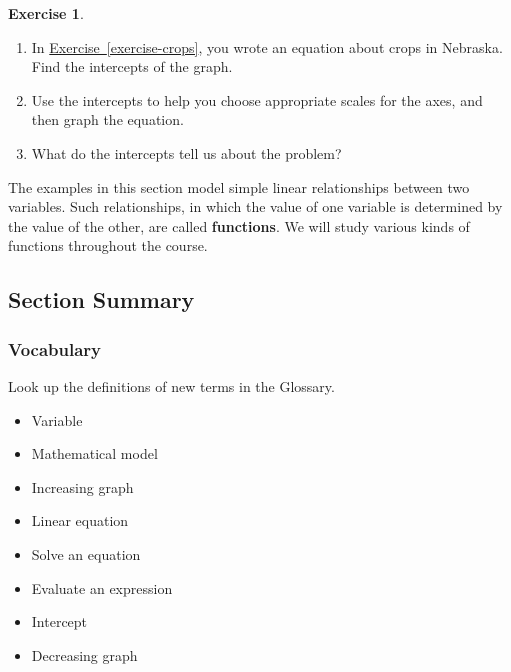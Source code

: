\documentclass[10pt,]{book}
\newcommand{\terminology}[1]{\textbf{#1}}
\theoremstyle{plain}
\theoremstyle{definition}
\theoremstyle{definition}
\theoremstyle{definition}
\theoremstyle{definition}
\newtheorem{exercise}[theorem]{Exercise}
\numberwithin{equation}{part}
\begin{document}
\begin{exercise}\label{exercise-intercepts}
\leavevmode%
\begin{enumerate}[label=\alph*]
\item\hypertarget{li-82}{}In \hyperref[exercise-crops]{Exercise~\ref{exercise-crops}}, you wrote an equation about crops in Nebraska. Find the intercepts of the graph.%
\item\hypertarget{li-83}{}Use the intercepts to help you choose appropriate scales for the axes, and then graph the equation.%
\item\hypertarget{li-84}{}What do the intercepts tell us about the problem?%
\end{enumerate}
\end{exercise}
The examples in this section model simple linear relationships between two variables. Such relationships, in which the value of one variable is determined by the value of the other, are called \terminology{functions}. We will study various kinds of functions throughout the course.%
\typeout{************************************************}
\typeout{************************************************}
\subsection[{Section Summary}]{Section Summary}\label{summary-1-1}
\typeout{************************************************}
\typeout{************************************************}
\subsubsection[{Vocabulary}]{Vocabulary}\label{subsubsection-1}
Look up the definitions of new terms in the Glossary. \leavevmode%
\begin{multicols}{3}
\begin{itemize}[label=\textbullet]
\item{}Variable%
\item{}Mathematical model%
\item{}Increasing graph%
\item{}Linear equation%
\item{}Solve an equation%
\item{}Evaluate an expression%
\item{}Intercept%
\item{}Decreasing graph%
\end{itemize}
\end{multicols}
%
\typeout{************************************************}
\typeout{************************************************}
\end{document}
